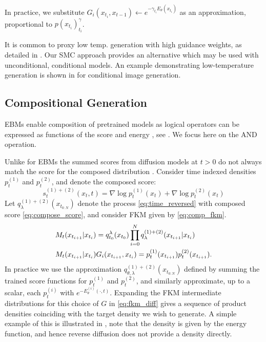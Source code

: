 In practice, we substitute $G_i(x_{t_{i}},x_{t-1}) \gets e^{-\gamma_{t_i} E_\theta(x_{t_i})}$ as an approximation, proportional to $p(x_{t_i})^\gamma_{t_i}$. 

It is common to proxy low temp. generation with high guidance weights, as detailed in . Our SMC approach provides an alternative which may be used with unconditional, conditional models. An example demonstrating low-temperature generation is shown in  for conditional image generation. 

\subsection{Compositional Generation}\label{sec:composition_scores}
EBMs enable composition of pretrained models  as logical operators can be expressed as functions of the score and energy \citep{compose_ebm, compose_diffusion}, see . We focus here on the \textsc{AND} operation. 

Unlike for EBMs the summed scores from diffusion models at $t>0$ do not always match the score for the composed distribution \citep{du2023reduce}. Consider time indexed densities $p^{(1)}_{t}$ and $p^{(2)}_{t}$, and denote the composed score:
\begin{equation}\label{eq:compose_score}
    s^{(1)+(2)}_t(x_t, t) = \nabla \log p^{(1)}_{t}(x_t) + \nabla \log p^{(2)}_{t}(x_t)
\end{equation}
Let ${q}_{\lambda}^{(1)+(2)}(x_{t_{0:N}})$ denote the process \eqref{eq:time_reversed} with composed score \eqref{eq:compose_score}, and consider FKM given by \eqref{eq:comp_fkm}.
\begin{align}
    &M_t(x_{t_{i+1}}|x_{t_{i}})= q^\lambda_{t_0}(x_{t_0})\prod_{i=0}^N {q}_{\lambda}^{(1)+(2)}(x_{t_{i+1}}|x_{t_{i}}) \label{eq:comp_fkm}\\ &M_t(x_{t_{i+1}}|x_{t_{i}})G_i(x_{t_{i+1}}, x_{t_{i}}) = p^{(1)}_{t}(x_{t_{i+1}})p^{(2)}_{t}(x_{t_{i+1}}). \notag
\end{align}
In practice we use the approximation ${q}_{\theta, \lambda}^{(1)+(2)}(x_{t_{0:N}})$ defined by summing the trained score functions for $p^{(1)}_{t}$ and $p^{(2)}_{t}$, and similarly approximate, up to a scalar, each $p^{(i)}_{t}$ with $e^{-E^{(i)}_\theta(\cdot,t)}$. Expanding the FKM intermediate distributions for this choice of $G$ in \eqref{eq:fkm_diff} gives a sequence of product densities coinciding with the target density we wish to generate. A simple example of this is illustrated in , note that the density is given by the energy function, and hence reverse diffusion does not provide a density directly.

